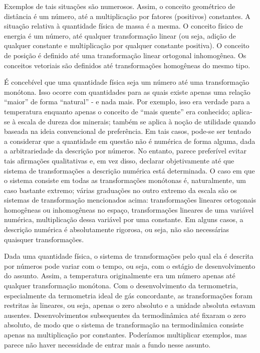 \documentclass[a4paper,12pt]{article}[abntex2]
\begin{document}
Exemplos de tais situações são numerosos. Assim, o conceito geométrico de distância é um número, até a multiplicação por fatores (positivos) constantes. A situação relativa à quantidade física de massa é a mesma. O conceito físico de energia é um número, até qualquer transformação linear (ou seja, adição de qualquer constante e multiplicação por qualquer constante positiva). O conceito de posição é definido até uma transformação linear ortogonal inhomogênea. Os conceitos vetoriais são definidos até transformações homogêneas do mesmo tipo.

É concebível que uma quantidade física seja um número até uma transformação monótona. Isso ocorre com quantidades para as quais existe apenas uma relação “maior” de forma “natural” - e nada mais. Por exemplo, isso era verdade para a temperatura enquanto apenas o conceito de “mais quente” era conhecido; aplica-se à escala de dureza dos minerais; também se aplica à noção de utilidade quando baseada na ideia convencional de preferência. Em tais casos, pode-se ser tentado a considerar que a quantidade em questão não é numérica de forma alguma, dada a arbitrariedade da descrição por números. No entanto, parece preferível evitar tais afirmações qualitativas e, em vez disso, declarar objetivamente até que sistema de transformações a descrição numérica está determinada. O caso em que o sistema consiste em todas as transformações monótonas é, naturalmente, um caso bastante extremo; várias graduações no outro extremo da escala são os sistemas de transformação mencionados acima: transformações lineares ortogonais homogêneas ou inhomogêneas no espaço, transformações lineares de uma variável numérica, multiplicação dessa variável por uma constante. Em alguns casos, a descrição numérica é absolutamente rigorosa, ou seja, não são necessárias quaisquer transformações.

Dada uma quantidade física, o sistema de transformações pelo qual ela é descrita por números pode variar com o tempo, ou seja, com o estágio de desenvolvimento do assunto. Assim, a temperatura originalmente era um número apenas até qualquer transformação monótona. Com o desenvolvimento da termometria, especialmente da termometria ideal de gás concordante, as transformações foram restritas às lineares, ou seja, apenas o zero absoluto e a unidade absoluta estavam ausentes. Desenvolvimentos subsequentes da termodinâmica até fixaram o zero absoluto, de modo que o sistema de transformação na termodinâmica consiste apenas na multiplicação por constantes. Poderíamos multiplicar exemplos, mas parece não haver necessidade de entrar mais a fundo nesse assunto.
\end{document}
